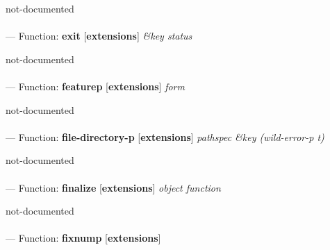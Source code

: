 \begin{adjustwidth}{5em}{5em}
not-documented
\end{adjustwidth}

\paragraph{}
\label{EXTENSIONS:EXIT}
--- Function: \textbf{exit} [\textbf{extensions}] \textit{\&key status}

\begin{adjustwidth}{5em}{5em}
not-documented
\end{adjustwidth}

\paragraph{}
\label{EXTENSIONS:FEATUREP}
--- Function: \textbf{featurep} [\textbf{extensions}] \textit{form}

\begin{adjustwidth}{5em}{5em}
not-documented
\end{adjustwidth}

\paragraph{}
\label{EXTENSIONS:FILE-DIRECTORY-P}
--- Function: \textbf{file-directory-p} [\textbf{extensions}] \textit{pathspec \&key (wild-error-p t)}

\begin{adjustwidth}{5em}{5em}
not-documented
\end{adjustwidth}

\paragraph{}
\label{EXTENSIONS:FINALIZE}
--- Function: \textbf{finalize} [\textbf{extensions}] \textit{object function}

\begin{adjustwidth}{5em}{5em}
not-documented
\end{adjustwidth}

\paragraph{}
\label{EXTENSIONS:FIXNUMP}
--- Function: \textbf{fixnump} [\textbf{extensions}] \textit{}

